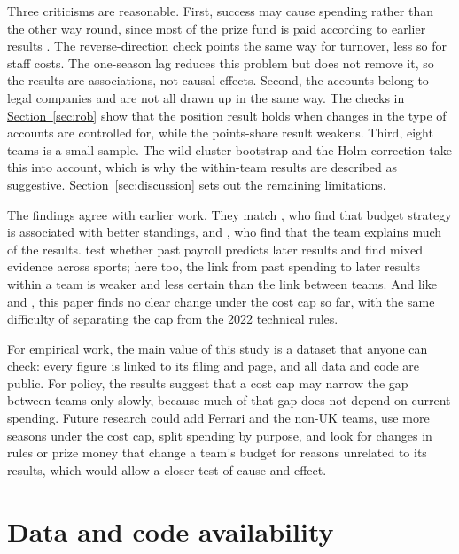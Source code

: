 \documentclass[11pt,a4paper]{article}
\begin{document}
Three criticisms are reasonable. First, success may cause spending rather than the other way round, since most of the prize
fund is paid according to earlier results \citep{liberty2018}. The reverse-direction check points the same way for
turnover, less so for staff costs. The one-season lag reduces this problem but does not remove it, so the results are
associations, not causal effects. Second, the accounts belong to legal companies and are not all
drawn up in the same way. The checks in \hyperref[sec:rob]{Section~\ref*{sec:rob}} show that the position result holds when
changes in the type of accounts are controlled for, while the points-share result weakens. Third, eight teams is a small
sample. The wild cluster bootstrap and the Holm correction take this into account, which is why the within-team results are
described as suggestive. \hyperref[sec:discussion]{Section~\ref*{sec:discussion}} sets out the remaining limitations.

The findings agree with earlier work. They match \citet{lonik2024}, who find that budget strategy is associated with better
standings, and \citet{bell2016}, who find that the team explains much of the results. \citet{hall2002} test whether past
payroll predicts later results and find mixed evidence across sports; here too, the link from past spending to later
results within a team is weaker and less certain than the link between teams. And like \citet{foghsgaard2024} and
\citet{jung2023}, this paper finds no clear change under the cost cap so far, with the same difficulty of separating the cap
from the 2022 technical rules.

For empirical work, the main value of this study is a dataset that anyone can check: every figure is linked to its filing
and page, and all data and code are public. For policy, the results suggest that a cost cap may narrow the gap between
teams only slowly, because much of that gap does not depend on current spending. Future research could add Ferrari and the
non-UK teams, use more seasons under the cost cap, split spending by purpose, and look for changes in rules or prize money
that change a team's budget for reasons unrelated to its results, which would allow a closer test of cause and effect.

\section*{Data and code availability}
\end{document}
